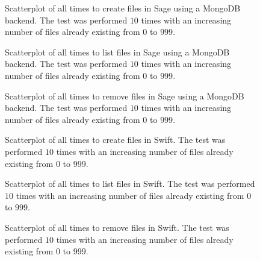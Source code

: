 \begin{figure}[!h]
\centering
{}
\caption[SageMongo Create Scatterplot]{Scatterplot of all times to create files in Sage using a MongoDB backend. The test was performed $10$ times with an increasing number of files already existing from $0$ to $999$.}
\label{fig:sagemongocreatescatter}
\end{figure}

\begin{figure}[!h]
\centering
{}
\caption[SageMongo List Scatterplot]{Scatterplot of all times to list files in Sage using a MongoDB backend. The test was performed $10$ times with an increasing number of files already existing from $0$ to $999$.}
\label{fig:sagemongolistscatter}
\end{figure}

\begin{figure}[!h]
\centering
{}
\caption[SageMongo Remove Scatterplot]{Scatterplot of all times to remove files in Sage using a MongoDB backend. The test was performed $10$ times with an increasing number of files already existing from $0$ to $999$.}
\label{fig:sagemongoremovescatter}
\end{figure}

\begin{figure}[!h]
\centering
{}
\caption[Swift Create Scatterplot]{Scatterplot of all times to create files in Swift. The test was performed $10$ times with an increasing number of files already existing from $0$ to $999$.}
\label{fig:swiftcreatescatter}
\end{figure}

\clearpage

\begin{figure}[!h]
\centering
{}
\caption[Swift List Scatterplot]{Scatterplot of all times to list files in Swift. The test was performed $10$ times with an increasing number of files already existing from $0$ to $999$.}
\label{fig:swiftlistscatter}
\end{figure}

\begin{figure}[!h]
\centering
{}
\caption[Swift Remove Scatterplot]{Scatterplot of all times to remove files in Swift. The test was performed $10$ times with an increasing number of files already existing from $0$ to $999$.}
\label{fig:swiftremovescatter}
\end{figure}


